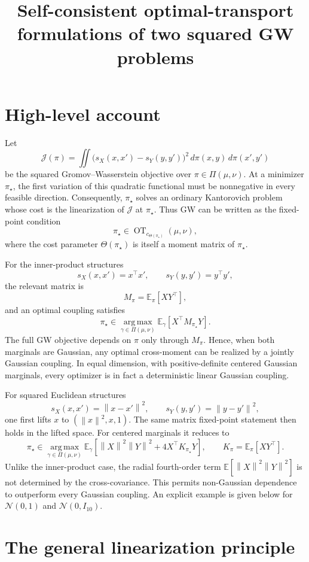 \documentclass[11pt]{article}
\title{Self-consistent optimal-transport formulations of two squared GW problems}
\author{}
\date{}
\newcommand{\E}{\mathbb{E}}
\newcommand{\cJ}{\mathcal{J}}
\newcommand{\PiCouplings}{\Pi}
\newcommand{\norm}[1]{\left\lVert #1\right\rVert}
\newcommand{\argmax}{\operatorname*{arg\,max}}
\begin{document}
\maketitle

\section*{High-level account}

Let
\[
\cJ(\pi)
=
\iint
\bigl(s_X(x,x')-s_Y(y,y')\bigr)^2
\,d\pi(x,y)\,d\pi(x',y')
\]
be the squared Gromov--Wasserstein objective over
$\pi\in\PiCouplings(\mu,\nu)$.
At a minimizer $\pi_\star$, the first variation of this quadratic
functional must be nonnegative in every feasible direction. Consequently,
$\pi_\star$ solves an ordinary Kantorovich problem whose cost is the
linearization of $\cJ$ at $\pi_\star$. Thus GW can be written as the
fixed-point condition
\[
\boxed{
\pi_\star\in
\operatorname{OT}_{c_{\Theta(\pi_\star)}}(\mu,\nu),
}
\]
where the cost parameter $\Theta(\pi_\star)$ is itself a moment matrix of
$\pi_\star$.

For the inner-product structures
\[
s_X(x,x')=x^\top x',
\qquad
s_Y(y,y')=y^\top y',
\]
the relevant matrix is
\[
M_\pi=\E_\pi[XY^\top],
\]
and an optimal coupling satisfies
\[
\pi_\star\in
\argmax_{\gamma\in\PiCouplings(\mu,\nu)}
\E_\gamma[X^\top M_{\pi_\star}Y].
\]
The full GW objective depends on $\pi$ only through $M_\pi$. Hence, when
both marginals are Gaussian, any optimal cross-moment can be realized by a
jointly Gaussian coupling. In equal dimension, with positive-definite
centered Gaussian marginals, every optimizer is in fact a deterministic
linear Gaussian coupling.

For squared Euclidean structures
\[
s_X(x,x')=\norm{x-x'}^2,
\qquad
s_Y(y,y')=\norm{y-y'}^2,
\]
one first lifts $x$ to $(\norm{x}^2,x,1)$. The same matrix fixed-point
statement then holds in the lifted space. For centered marginals it reduces
to
\[
\pi_\star\in
\argmax_{\gamma\in\PiCouplings(\mu,\nu)}
\E_\gamma\!\left[
\norm{X}^2\norm{Y}^2+4X^\top K_{\pi_\star}Y
\right],
\qquad
K_\pi=\E_\pi[XY^\top].
\]
Unlike the inner-product case, the radial fourth-order term
$\E[\norm{X}^2\norm{Y}^2]$ is not determined by the cross-covariance.
This permits non-Gaussian dependence to outperform every Gaussian
coupling. An explicit example is given below for
$\mathcal N(0,1)$ and $\mathcal N(0,I_{10})$.

\section{The general linearization principle}
\end{document}
